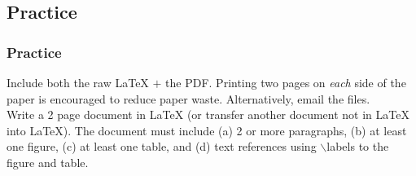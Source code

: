 \documentclass[slidestop,compress,mathserif]{beamer}
\begin{document}
\subsection[Practice]{Practice}
\begin{frame}
		\frametitle{Practice}
		
	Include both the raw LaTeX $+$ the PDF. Printing two pages on \emph{each} side of the paper is encouraged to reduce paper waste. Alternatively, email the files. \\[5mm]

	Write a 2 page document in LaTeX (or transfer another document not in LaTeX into LaTeX). The document must include (a) 2 or more paragraphs, (b) at least one figure, (c) at least one table, and (d) text references using {\color{command}$\backslash$label}s to the figure and table.
	
\end{frame}
\end{document}
